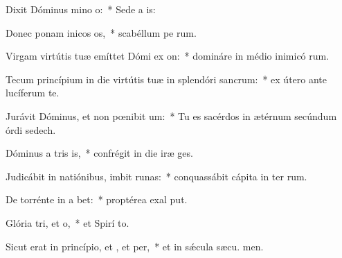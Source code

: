 \item Dixit Dóminus mino o:~* Sede a  is:
\item Donec ponam inicos os,~* scabéllum pe rum.
\item Virgam virtútis tuæ emíttet Dómi ex on:~* domináre in médio inimicó rum.
\item Tecum princípium in die virtútis tuæ in splendóri sancrum:~* ex útero ante lucíferum  te.
\item Jurávit Dóminus, et non pœnibit um:~* Tu es sacérdos in ætérnum secúndum órdi sedech.
\item Dóminus a tris is,~* confrégit in die iræ  ges.
\item Judicábit in natiónibus, imbit runas:~* conquassábit cápita in ter rum.
\item De torrénte in a bet:~* proptérea exal put.
\item Glória tri, et o,~* et Spirí to.
\item Sicut erat in princípio, et , et per,~* et in sǽcula sæcu. men.
